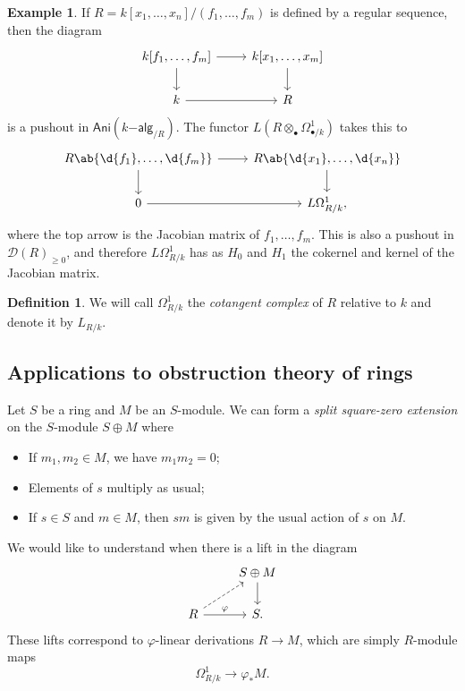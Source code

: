 \documentclass[10pt, oneside]{memoir}
\theoremstyle{definition}
\newtheorem{defn}[thm]{Definition}
\newtheorem{exm}[thm]{Example}
\theoremstyle{remark}
\theoremstyle{plain}
\theoremstyle{definition}
\theoremstyle{remark}
\newcommand{\mc}[1]{\mathcal{#1}}
\newcommand{\ms}[1]{\mathsf{#1}}
\newcommand{\1}{\mathbf{1}}
\newcommand{\2}{\mathbf{2}}
\newcommand{\3}{\mathbf{3}}
\begin{document}
\begin{exm}
    If $R = k[x_1, \ldots, x_n] / (f_1, \ldots, f_m)$ is defined by a regular sequence, then the diagram
    \begin{equation*}
    \begin{tikzcd}
        k[f_1, \ldots, f_m] \ar{r} \ar{d} & k[x_1, \ldots, x_m] \ar{d} \\
        k \ar{r} & R
    \end{tikzcd}
    \end{equation*}
    is a pushout in $\ms{Ani}(k\ms{-alg}_{/R})$. The functor $L(R \otimes_{\bullet} \Omega^1_{\bullet/k})$ takes this to
    \begin{equation*}
    \begin{tikzcd}
        R\ab\{\d{f_1}, \ldots, \d{f_m} \}  \ar{r} \ar{d} & R \ab\{ \d{x_1}, \ldots, \d{x_n}\} \ar{d} \\
         0 \ar{r} & L \Omega^1_{R/k},
    \end{tikzcd}
    \end{equation*}
    where the top arrow is the Jacobian matrix of $f_1, \ldots, f_m$. This is also a pushout in $\mc{D}(R)_{\geq 0}$, and therefore $L\Omega^1_{R/k}$ has as $H_0$ and $H_1$ the cokernel and kernel of the Jacobian matrix.
\end{exm}

\begin{defn}
    We will call $\Omega^1_{R/k}$ the \textit{cotangent complex} of $R$ relative to $k$ and denote it by $L_{R/k}$.
\end{defn}

\subsection{Applications to obstruction theory of rings}%
\label{sub:Applications to obstruction theory of rings}

Let $S$ be a ring and $M$ be an $S$-module. We can form a \textit{split square-zero extension} on the $S$-module $S \oplus M$ where
\begin{itemize}
    \item If $m_1, m_2 \in M$, we have $m_1 m_2 = 0$;
    \item Elements of $s$ multiply as usual;
    \item If $s \in S$ and $m \in M$, then $sm$ is given by the usual action of $s$ on $M$.
\end{itemize}
We would like to understand when there is a lift in the diagram
\begin{equation*}
\begin{tikzcd}
    & S \oplus M \ar{d} \\
    R \ar{r}{\varphi} \ar[dashrightarrow]{ur} & S.
\end{tikzcd}
\end{equation*}
These lifts correspond to $\varphi$-linear derivations $R \to M$, which are simply $R$-module maps
\[ \Omega^1_{R/k} \to \varphi_* M. \]
\end{document}
